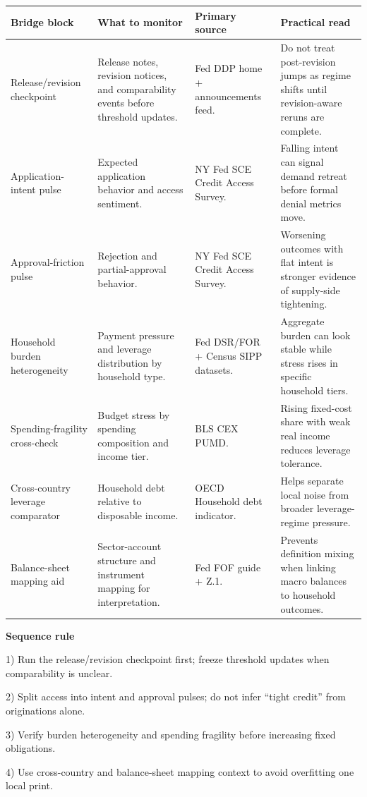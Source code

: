 \documentclass[11pt,openany]{book}
\begin{document}
\begin{center}
\small
\begin{tabularx}{\textwidth}{>{\raggedright\arraybackslash}p{}>{\raggedright\arraybackslash}p{}>{\raggedright\arraybackslash}p{}X}
\toprule
\textbf{Bridge block} & \textbf{What to monitor} & \textbf{Primary source} & \textbf{Practical read} \\
\midrule
Release/revision checkpoint & Release notes, revision notices, and comparability events before threshold updates. & Fed DDP home + announcements feed. & Do not treat post-revision jumps as regime shifts until revision-aware reruns are complete. \\
Application-intent pulse & Expected application behavior and access sentiment. & NY Fed SCE Credit Access Survey. & Falling intent can signal demand retreat before formal denial metrics move. \\
Approval-friction pulse & Rejection and partial-approval behavior. & NY Fed SCE Credit Access Survey. & Worsening outcomes with flat intent is stronger evidence of supply-side tightening. \\
Household burden heterogeneity & Payment pressure and leverage distribution by household type. & Fed DSR/FOR + Census SIPP datasets. & Aggregate burden can look stable while stress rises in specific household tiers. \\
Spending-fragility cross-check & Budget stress by spending composition and income tier. & BLS CEX PUMD. & Rising fixed-cost share with weak real income reduces leverage tolerance. \\
Cross-country leverage comparator & Household debt relative to disposable income. & OECD Household debt indicator. & Helps separate local noise from broader leverage-regime pressure. \\
Balance-sheet mapping aid & Sector-account structure and instrument mapping for interpretation. & Fed FOF guide + Z.1. & Prevents definition mixing when linking macro balances to household outcomes. \\
\bottomrule
\end{tabularx}
\normalsize
\end{center}

\begin{notebox}
\textbf{Sequence rule}\par
1) Run the release/revision checkpoint first; freeze threshold updates when comparability is unclear.\par
2) Split access into intent and approval pulses; do not infer ``tight credit'' from originations alone.\par
3) Verify burden heterogeneity and spending fragility before increasing fixed obligations.\par
4) Use cross-country and balance-sheet mapping context to avoid overfitting one local print.
\end{notebox}
\end{document}
